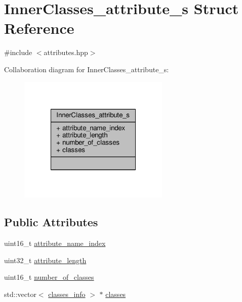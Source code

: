 \hypertarget{structInnerClasses__attribute__s}{\section{Inner\+Classes\+\_\+attribute\+\_\+s Struct Reference}
\label{structInnerClasses__attribute__s}
}


{\ttfamily \#include $<$attributes.\+hpp$>$}



Collaboration diagram for Inner\+Classes\+\_\+attribute\+\_\+s\+:\nopagebreak
\begin{figure}[H]
\begin{center}
\leavevmode
\includegraphics[width=204pt]{structInnerClasses__attribute__s__coll__graph}
\end{center}
\end{figure}
\subsection*{Public Attributes}
\begin{DoxyCompactItemize}
\item 
uint16\+\_\+t \hyperlink{structInnerClasses__attribute__s_a8ea7a6459f4a7ae27d23fa13d15b058c}{attribute\+\_\+name\+\_\+index}
\item 
uint32\+\_\+t \hyperlink{structInnerClasses__attribute__s_ab142de1a85a18b4fa3f49b77668fcd4f}{attribute\+\_\+length}
\item 
uint16\+\_\+t \hyperlink{structInnerClasses__attribute__s_ad5b6fc395dfe3380ec6a16df0cc618a4}{number\+\_\+of\+\_\+classes}
\item 
std\+::vector$<$ \hyperlink{classclasses__info}{classes\+\_\+info} $>$ $\ast$ \hyperlink{structInnerClasses__attribute__s_a3461afb1424fa780c0ac8053ead725f7}{classes}
\end{DoxyCompactItemize}


